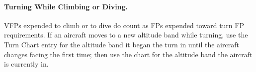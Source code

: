 

\paragraph{Turning While Climbing or Diving.} 
VFPs expended to climb or to dive do count as FPs expended toward turn FP requirements. If an aircraft moves to a new altitude band while turning, use the Turn Chart entry for the altitude band it began the turn in until the aircraft changes facing the first time; then use the chart for the altitude band the aircraft is currently in.

